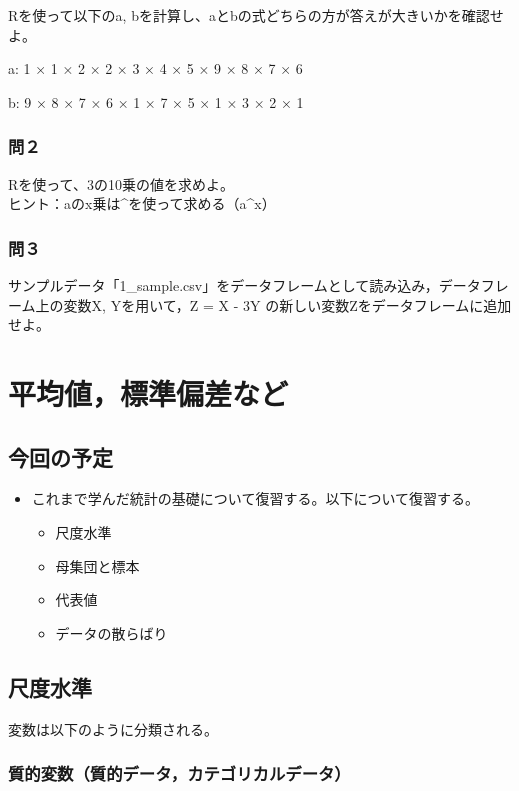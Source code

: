 \documentclass[]{article}
\providecommand{\tightlist}{%
  \setlength{\itemsep}{0pt}\setlength{\parskip}{0pt}}
\begin{document}
Rを使って以下のa,
bを計算し、aとbの式どちらの方が答えが大きいかを確認せよ。

a: 1 × 1 × 2 × 2 × 3 × 4 × 5 × 9 × 8 × 7 × 6

b: 9 × 8 × 7 × 6 × 1 × 7 × 5 × 1 × 3 × 2 × 1

\subsubsection{問２}\label{-1}

Rを使って、3の10乗の値を求めよ。\\
ヒント：aのx乗は\^{}を使って求める（a\^{}x）

\subsubsection{問３}\label{-2}

サンプルデータ「1\_sample.csv」をデータフレームとして読み込み，データフレーム上の変数X,
Yを用いて，Z = X - 3Y の新しい変数Zをデータフレームに追加せよ。

\section{平均値，標準偏差など}

\subsection{今回の予定}\label{-1}

\begin{itemize}
\tightlist
\item
  これまで学んだ統計の基礎について復習する。以下について復習する。

  \begin{itemize}
  \tightlist
  \item
    尺度水準
  \item
    母集団と標本
  \item
    代表値
  \item
    データの散らばり
  \end{itemize}
\end{itemize}

\subsection{尺度水準}

変数は以下のように分類される。

\subsubsection{質的変数（質的データ，カテゴリカルデータ）}
\end{document}
